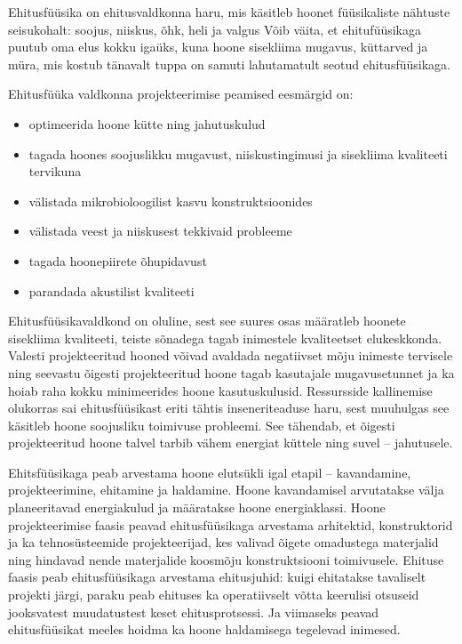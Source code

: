 \label{chapters:introduction}
Ehitusfüüsika on ehitusvaldkonna haru, mis käsitleb hoonet füüsikaliste nähtuste seisukohalt: soojus, niiskus, õhk, heli ja valgus
Võib väita, et ehitufüüsikaga puutub oma elus kokku igaüks, kuna hoone sisekliima mugavus, küttarved ja müra, mis kostub tänavalt tuppa
on samuti lahutamatult seotud ehitusfüüsikaga.

Ehitusfüüka valdkonna projekteerimise peamised eesmärgid on:
\begin{itemize}
    \item optimeerida hoone kütte ning jahutuskulud
    \item tagada hoones soojuslikku mugavust, niiskustingimusi ja sisekliima kvaliteeti tervikuna
    \item välistada mikrobioloogilist kasvu konstruktsioonides
    \item välistada veest ja niiskusest tekkivaid probleeme
    \item tagada hoonepiirete õhupidavust
    \item parandada akustilist kvaliteeti
\end{itemize}

Ehitusfüüsikavaldkond on oluline, sest see suures osas määratleb hoonete sisekliima kvaliteeti, teiste sõnadega tagab inimestele kvaliteetset 
elukeskkonda. Valesti projekteeritud hooned võivad avaldada negatiivset mõju inimeste tervisele ning seevastu õigesti projekteeritud 
hoone tagab kasutajale mugavusetunnet ja ka hoiab raha kokku minimeerides hoone kasutuskulusid. Ressursside kallinemise olukorras sai 
ehitusfüüsikast eriti tähtis inseneriteaduse haru, sest muuhulgas see käsitleb hoone soojusliku 
toimivuse probleemi. See tähendab, et õigesti projekteeritud hoone talvel tarbib vähem energiat küttele ning suvel -- jahutusele.

Ehitsfüüsikaga peab arvestama hoone elutsükli igal etapil -- kavandamine, projekteerimine, ehitamine ja haldamine. Hoone kavandamisel 
arvutatakse välja planeeritavad energiakulud ja määratakse hoone energiaklassi. Hoone projekteerimise faasis peavad ehitusfüüsikaga arvestama arhitektid, 
konstruktorid ja ka tehnosüsteemide projekteerijad, kes valivad õigete omadustega materjalid ning hindavad nende materjalide koosmõju 
konstruktsiooni toimivusele. Ehituse faasis peab ehitusfüüsikaga arvestama ehitusjuhid: kuigi ehitatakse tavaliselt projekti järgi, 
paraku peab ehituses ka operatiivselt võtta keerulisi otsuseid jooksvatest muudatustest keset ehitusprotsessi. Ja viimaseks peavad 
ehitusfüüsikat meeles hoidma ka hoone haldamisega tegelevad inimesed.

